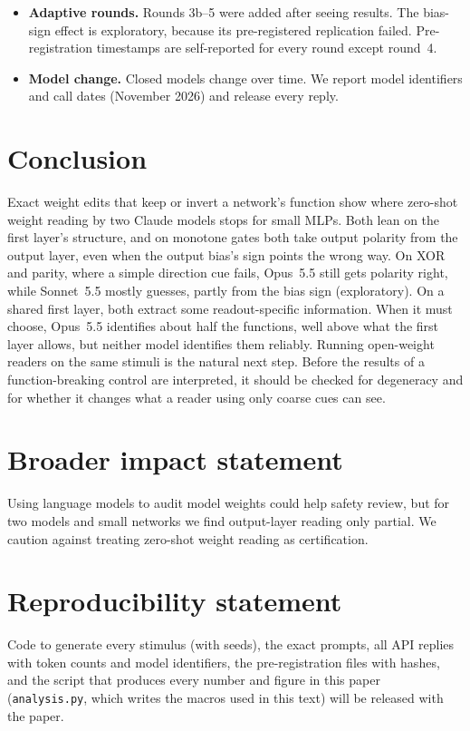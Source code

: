 \documentclass[10pt]{article}
\newcommand{\codelink}{will be released with the paper}
\newcommand{\codelink}{are available at \url{https://github.com/SummitAnthony/zero-shot-weight-reading}}
\newcommand{\Sonnet}{Sonnet~5.5}
\newcommand{\Opus}{Opus~5.5}
\begin{document}
\begin{itemize}
\item \textbf{Adaptive rounds.} Rounds 3b--5 were added after seeing results. The bias-sign effect is exploratory, because its pre-registered replication failed. Pre-registration timestamps are self-reported for every round except round~4.
\item \textbf{Model change.} Closed models change over time. We report model identifiers and call dates (November 2026) and release every reply.
\end{itemize}

\section{Conclusion}
Exact weight edits that keep or invert a network's function show where zero-shot weight reading by two Claude models stops for small MLPs. Both lean on the first layer's structure, and on monotone gates both take output polarity from the output layer, even when the output bias's sign points the wrong way. On XOR and parity, where a simple direction cue fails, \Opus{} still gets polarity right, while \Sonnet{} mostly guesses, partly from the bias sign (exploratory). On a shared first layer, both extract some readout-specific information. When it must choose, \Opus{} identifies about half the functions, well above what the first layer allows, but neither model identifies them reliably. Running open-weight readers on the same stimuli is the natural next step. Before the results of a function-breaking control are interpreted, it should be checked for degeneracy and for whether it changes what a reader using only coarse cues can see.

\section*{Broader impact statement}
Using language models to audit model weights could help safety review, but for two models and small networks we find output-layer reading only partial. We caution against treating zero-shot weight reading as certification.

\section*{Reproducibility statement}
Code to generate every stimulus (with seeds), the exact prompts, all \nRFiveTotalCalls{} API replies with token counts and model identifiers, the pre-registration files with hashes, and the script that produces every number and figure in this paper (\texttt{analysis.py}, which writes the macros used in this text) \codelink.
\end{document}
